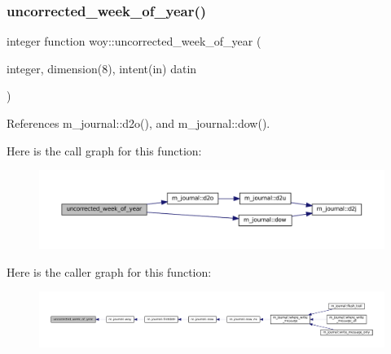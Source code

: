 \subsubsection{\texorpdfstring{uncorrected\+\_\+week\+\_\+of\+\_\+year()}{uncorrected\_week\_of\_year()}}
{\footnotesize\ttfamily integer function woy\+::uncorrected\+\_\+week\+\_\+of\+\_\+year (\begin{DoxyParamCaption}\item[{integer, dimension(8), intent(in)}]{datin }\end{DoxyParamCaption})\hspace{0.3cm}{\ttfamily [private]}}



References m\+\_\+journal\+::d2o(), and m\+\_\+journal\+::dow().

Here is the call graph for this function\+:\nopagebreak
\begin{figure}[H]
\begin{center}
\leavevmode
\includegraphics[width=350pt]{M__journal_8f90_a41382743ce1b42e02a3f42146e3fa53f_cgraph}
\end{center}
\end{figure}
Here is the caller graph for this function\+:\nopagebreak
\begin{figure}[H]
\begin{center}
\leavevmode
\includegraphics[width=350pt]{M__journal_8f90_a41382743ce1b42e02a3f42146e3fa53f_icgraph}
\end{center}
\end{figure}
